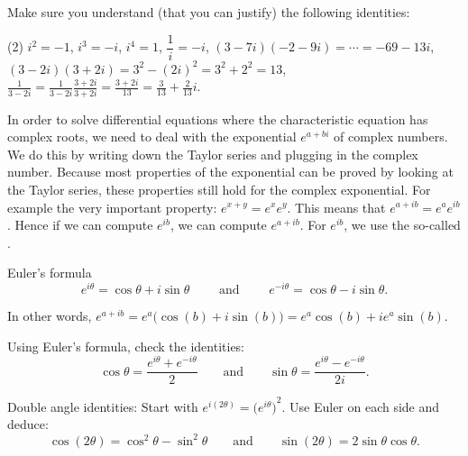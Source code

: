\documentclass{ximera}
\begin{document}
\begin{exercise}
    Make sure you understand (that you can justify) the following identities:
    \begin{tasks}(2)
        \task $i^2 = -1$, $i^3 = -i$, $i^4 = 1$,
        \task $\dfrac{1}{i} = -i$,
        \task $(3-7i)(-2-9i) = \cdots = -69-13i$,
        \task $(3-2i)(3+2i) = 3^2 - {(2i)}^2 = 3^2 + 2^2 = 13$,
        \task $\frac{1}{3-2i} = \frac{1}{3-2i} \frac{3+2i}{3+2i} = \frac{3+2i}{13} = \frac{3}{13}+\frac{2}{13}i$.
    \end{tasks}
\end{exercise}

In order to solve differential equations where the characteristic equation has complex roots, we need to deal with the exponential $e^{a+bi}$ of complex numbers. We do this by writing down the Taylor series and plugging in the complex number.  Because most properties of the exponential can be proved by looking at the Taylor series, these properties still hold for the complex exponential.  For example the very important property: $e^{x+y} = e^x e^y$.  This means that $e^{a+ib} = e^a e^{ib}$.  Hence if we can compute $e^{ib}$, we can compute $e^{a+ib}$.  For $e^{ib}$, we use the so-called \emph{}.

\begin{theorem}[eulersformula]{Euler's formula} 
    \begin{equation*}
        e^{i \theta} = \cos \theta + i \sin \theta \qquad \text{ and } \qquad e^{- i \theta} = \cos \theta - i \sin \theta .
    \end{equation*}
\end{theorem}

In other words, $e^{a+ib} = e^a \bigl( \cos(b) + i \sin(b) \bigr) = e^a \cos(b) + i e^a \sin(b)$.

\begin{exercise}
    Using Euler's formula, check the identities:
    \begin{equation*}
        \cos \theta = \frac{e^{i \theta} + e^{-i \theta}}{2} \qquad \text{and} \qquad \sin \theta = \frac{e^{i \theta} - e^{-i \theta}}{2i}.
    \end{equation*}
\end{exercise}

\begin{exercise}
    Double angle identities: Start with $e^{i(2\theta)} = {\bigl(e^{i \theta} \bigr)}^2$.  Use Euler on each side and deduce:
    \begin{equation*}
        \cos (2\theta) = \cos^2 \theta - \sin^2 \theta \qquad \text{and} \qquad \sin (2\theta) = 2 \sin \theta \cos \theta .
    \end{equation*}
\end{exercise}
\end{document}
